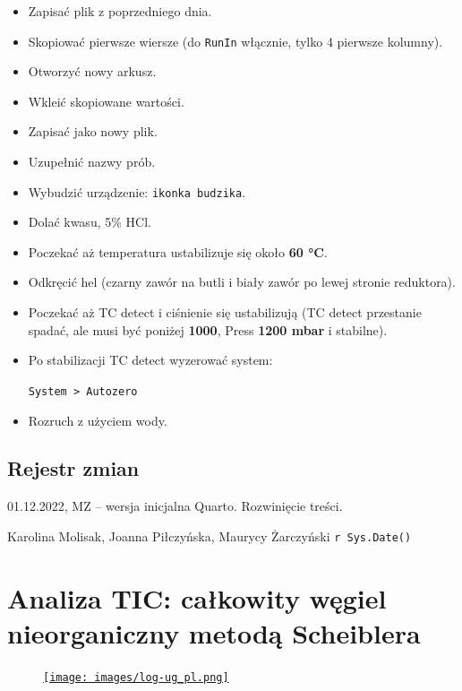 \documentclass[
  letterpaper,
  DIV=11,
  numbers=noendperiod]{scrreprt}
\begin{document}
\begin{itemize}
\item
  Zapisać plik z poprzedniego dnia.
\item
  Skopiować pierwsze wiersze (do \texttt{RunIn} włącznie, tylko 4
  pierwsze kolumny).
\item
  Otworzyć nowy arkusz.
\item
  Wkleić skopiowane wartości.
\item
  Zapisać jako nowy plik.
\item
  Uzupełnić nazwy prób.
\item
  Wybudzić urządzenie: \texttt{ikonka\ budzika}.
\item
  Dolać kwasu, 5\% HCl.
\item
  Poczekać aż temperatura ustabilizuje się około \textbf{60 °C}.
\item
  Odkręcić hel (czarny zawór na butli i biały zawór po lewej stronie
  reduktora).
\item
  Poczekać aż TC detect i ciśnienie się ustabilizują (TC detect
  przestanie spadać, ale musi być poniżej \textbf{1000}, Press
  \textbf{1200 mbar} i stabilne).
\item
  Po stabilizacji TC detect wyzerować system:

  \texttt{System\ \textgreater{}\ Autozero}
\item
  Rozruch z użyciem wody.
\end{itemize}

\hypertarget{rejestr-zmian-5}{%
\section{Rejestr zmian}\label{rejestr-zmian-5}}

01.12.2022, MZ -- wersja inicjalna Quarto. Rozwinięcie treści.

Karolina Molisak, Joanna Piłczyńska, Maurycy Żarczyński
\texttt{r\ Sys.Date()}

\hypertarget{analiza-tic-caux142kowity-wux119giel-nieorganiczny-metodux105-scheiblera}{%
\chapter{Analiza TIC: całkowity węgiel nieorganiczny metodą
Scheiblera}\label{analiza-tic-caux142kowity-wux119giel-nieorganiczny-metodux105-scheiblera}}

\begin{figure}

\href{https://geomorfologia.ug.edu.pl}{\texttt{[image: images/log-ug\_pl.png]}}

\end{figure}
\end{document}
